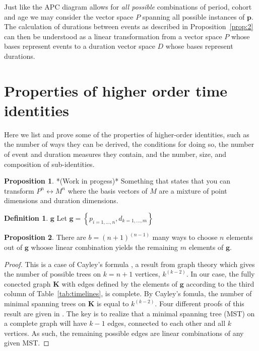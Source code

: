 \documentclass{bmcart}
\theoremstyle{definition}
\newtheorem{definition}{Definition}[section]
\newtheorem{proposition}{Proposition}[section]
\begin{document}
Just like the APC diagram allows for \emph{all possible} combinations of period,
cohort and age we may consider the vector space $P$ spanning all possible
instances of $\boldsymbol{p}$. The calculation of durations between events as
described in Proposition~\ref{prop:2} can then be understood as a linear
transformation from a vector space $P$ whose bases represent events to a
duration vector space $D$ whose bases represent durations.

\FloatBarrier
\section{Properties of higher order time identities}
Here we list and prove some of the properties of higher-order
identities, such as the number of ways they can be derived, the conditions
for doing so, the number of event and duration measures they contain, and the
number, size, and composition of sub-identities.

\begin{proposition}
\label{mixing} *(Work in progess)* Something that states that you can transform
 $P^n \leftrightarrow M^n$ where the basis vectors of $M$ are a mixture of point dimensions and duration dimensions.
\end{proposition}


\begin{definition}{$\textbf{g}$}
Let $\textbf{g} = \left\{p_{i=1,\ldots,n},
d_{k=1,\ldots,m}\right\}$
\end{definition}

\begin{proposition} There are $b = (n+1)^{(n-1)}$ many
ways to choose $n$ elements out of $\textbf{g}$ whoose linear combination yields the
remaining $m$ elements of $\textbf{g}$.
\end{proposition}

\begin{proof}
This is a case of Cayley's formula \citep{cayley1889}, a result from
graph theory which gives the number of possible trees on $k = n+1$ vertices,
$k^{(k-2)}$. In our case, the fully conected graph $\textbf{K}$ with edges
defined by the elements of $\textbf{g}$ according to the third column of
Table~\ref{tab:timelines}, is complete. By Cayley's fomula, the number of
minimal spanning trees on $\textbf{K}$ is equal to $k^{(k-2)}$. Four different proofs of
this result are given in \citet{aigner2010proofs}. The key is to realize that a
minimal spanning tree (MST) on a complete graph will have $k-1$ edges, connected
to each other and all $k$ vertices. As such, the remaining possible edges are
linear combinations of any given MST.
\end{proof}
\end{document}
